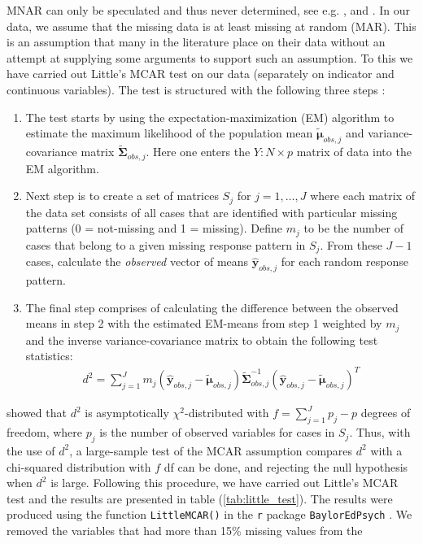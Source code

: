 \documentclass[../thesis.tex]{subfiles}
\begin{document}
\noindent MNAR can only be speculated and thus never determined, see e.g. \cite{rubin1976inference}, \cite{schafer2002missing} and \cite{moons2006using}. In our data, we assume that the missing data is at least missing at random (MAR). This is an assumption that many in the literature place on their data without an attempt at supplying some arguments to support such an assumption. To this we have carried out Little's MCAR test \citep{little1988test} on our data (separately on indicator and continuous variables). The test is structured with the following three steps : 
\begin{enumerate}[label=(\roman*)]
    \item The test starts by using the expectation-maximization (EM) algorithm \citep{dempster1977maximum} to estimate the maximum likelihood of the population mean $\bm{\tilde{\mu}}_{obs, j}$ and variance-covariance matrix $\bm{\tilde{\Sigma}}_{obs,j}$. Here one enters the $Y:N\times p$ matrix of data into the EM algorithm.
    \item Next step is to create a set of matrices $S_j$ for $j = 1, \hdots, J$ where each matrix of the data set consists of all cases that are identified with particular missing patterns (0 = not-missing and 1 = missing). Define $m_j$ to be the number of cases that belong to a given missing response pattern in $S_j$. From these $J-1$ cases, calculate the \textit{observed} vector of means $\bm{\hat{y}}_{obs, j}$ for each random response pattern. 
    \item The final step comprises of calculating the difference between the observed means in step 2 with the estimated EM-means from step 1 weighted by $m_j$ and the inverse variance-covariance matrix to obtain the following test statistics:
    \begin{align}
        d^2 = \sum_{j=1}^J m_j \left(\bm{\hat{y}}_{obs, j} -  \bm{\tilde{\mu}}_{obs, j}\right)\bm{\tilde{\Sigma}}_{obs,j}^{-1}\left(\bm{\hat{y}}_{obs, j} -  \bm{\tilde{\mu}}_{obs, j}\right)^T
    \end{align}
\end{enumerate}

\noindent \cite{little1988test} showed that $d^2$ is asymptotically $\chi^2$-distributed with $f = \sum_{j=1}^J p_j - p$ degrees of freedom, where $p_j$ is the number of observed variables for cases in $S_j$. Thus, with the use of $d^2$, a large-sample test of the MCAR assumption compares $d^2$ with a chi-squared distribution with $f$ df can be done, and rejecting the null hypothesis when $d^2$ is large. Following this procedure, we have carried out Little's MCAR test and the results are presented in table (\ref{tab:little_test}). The results were produced using the function \texttt{LittleMCAR()} in the \texttt{r} package \texttt{BaylorEdPsych} \citep{BaylorEdPsych}. We removed the variables that had more than 15\% missing values from the
\end{document}
